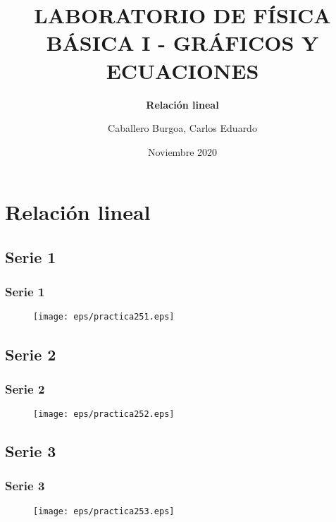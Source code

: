 \documentclass[letter,11pt]{beamer}
\title{\textbf{LABORATORIO DE FÍSICA BÁSICA I - GRÁFICOS Y ECUACIONES}}
\subtitle{\textbf{Relación lineal}}
\author{\small{Caballero Burgoa, Carlos Eduardo}}
\date{\tiny{Noviembre 2020}}
\begin{document}
\begin{frame}
\titlepage
\end{frame}

\section{Relación lineal}

\subsection{Serie 1}
\begin{frame}
\frametitle{Serie 1}
    \begin{figure}[!h]
        \centering
        \texttt{[image: eps/practica251.eps]}
    \end{figure}
\end{frame}

\subsection{Serie 2}
\begin{frame}
\frametitle{Serie 2}
    \begin{figure}[!h]
        \centering
        \texttt{[image: eps/practica252.eps]}
    \end{figure}
\end{frame}

\subsection{Serie 3}
\begin{frame}
\frametitle{Serie 3}
    \begin{figure}[!h]
        \centering
        \texttt{[image: eps/practica253.eps]}
    \end{figure}
\end{frame}
\end{document}
